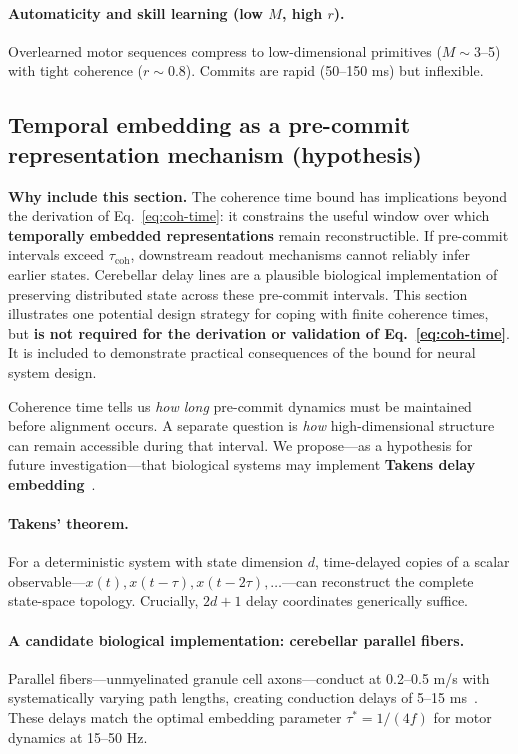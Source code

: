 \documentclass[12pt]{article}
\begin{document}
\paragraph{Automaticity and skill learning (low $M$, high $r$).}
Overlearned motor sequences compress to low-dimensional primitives ($M \sim 3$--5) with tight coherence ($r \sim 0.8$). Commits are rapid (50--150 ms) but inflexible.

\subsection{Temporal embedding as a pre-commit representation mechanism (hypothesis)}

\textbf{Why include this section.}
The coherence time bound has implications beyond the derivation of Eq.~\ref{eq:coh-time}:
it constrains the useful window over which \textbf{temporally embedded representations}
remain reconstructible. If pre-commit intervals exceed $\tau_{\mathrm{coh}}$,
downstream readout mechanisms cannot reliably infer earlier states.
Cerebellar delay lines are a plausible biological implementation of preserving
distributed state across these pre-commit intervals. This section illustrates
one potential design strategy for coping with finite coherence times, but
\textbf{is not required for the derivation or validation of Eq.~\ref{eq:coh-time}}.
It is included to demonstrate practical consequences of the bound for
neural system design.

Coherence time tells us \emph{how long} pre-commit dynamics must be maintained before alignment occurs. A separate question is \emph{how} high-dimensional structure can remain accessible during that interval. We propose---as a hypothesis for future investigation---that biological systems may implement \textbf{Takens delay embedding}~\cite{takens1981}.

\paragraph{Takens' theorem.}
For a deterministic system with state dimension $d$, time-delayed copies of a scalar observable---$x(t), x(t-\tau), x(t-2\tau), \ldots$---can reconstruct the complete state-space topology. Crucially, $2d+1$ delay coordinates generically suffice.

\paragraph{A candidate biological implementation: cerebellar parallel fibers.}
Parallel fibers---unmyelinated granule cell axons---conduct at 0.2--0.5 m/s with systematically varying path lengths, creating conduction delays of 5--15 ms~\cite{braitenberg1958,llinas1982,wyatt2005}. These delays match the optimal embedding parameter $\tau^* = 1/(4f)$ for motor dynamics at 15--50 Hz.
\end{document}
